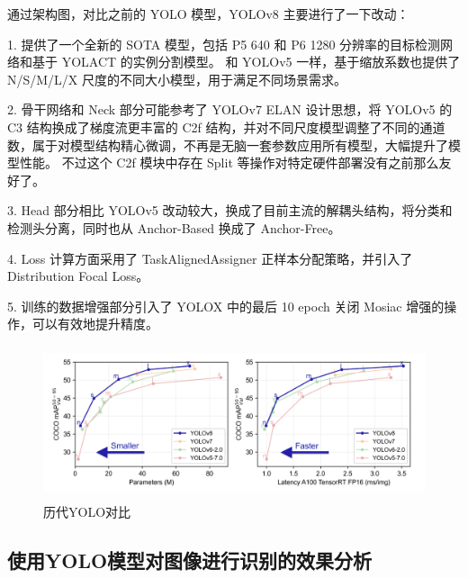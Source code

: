 \documentclass[UTF8]{ctexart}
\begin{document}
通过架构图，对比之前的 YOLO 模型，YOLOv8 主要进行了一下改动： \par
1. 提供了一个全新的 SOTA 模型，包括 P5 640 和 P6 1280 分辨率的目标检测网络和基于 YOLACT 的实例分割模型。
和 YOLOv5 一样，基于缩放系数也提供了 N/S/M/L/X 尺度的不同大小模型，用于满足不同场景需求。 \par
2. 骨干网络和 Neck 部分可能参考了 YOLOv7 ELAN 设计思想，将 YOLOv5 的 C3 结构换成了梯度流更丰富的 C2f 结构，并对不同尺度模型调整了不同的通道数，属于对模型结构精心微调，不再是无脑一套参数应用所有模型，大幅提升了模型性能。
不过这个 C2f 模块中存在 Split 等操作对特定硬件部署没有之前那么友好了。\par
3. Head 部分相比 YOLOv5 改动较大，换成了目前主流的解耦头结构，将分类和检测头分离，同时也从 Anchor-Based 换成了 Anchor-Free。\par
4. Loss 计算方面采用了 TaskAlignedAssigner 正样本分配策略，并引入了 Distribution Focal Loss。\par
5. 训练的数据增强部分引入了 YOLOX 中的最后 10 epoch 关闭 Mosiac 增强的操作，可以有效地提升精度。\par


\begin{figure}[H]
    \centering %
    \includegraphics[height=4.5cm]{../YOLO/pics/img.png}
    \caption{历代YOLO对比}
\end{figure}

\subsection{使用YOLO模型对图像进行识别的效果分析}

\newpage
\small



\end{document}
